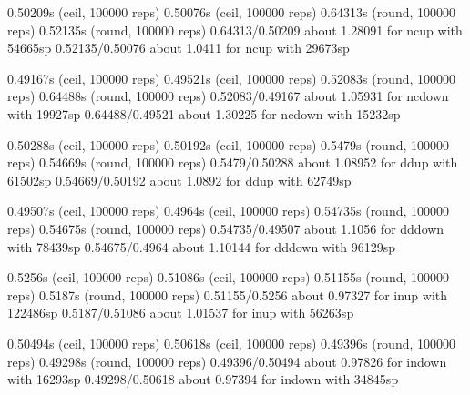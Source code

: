 0.50209s (ceil, 100000 reps)                            0.50076s (ceil, 100000 reps)                           
0.64313s (round, 100000 reps)                           0.52135s (round, 100000 reps)                          
0.64313/0.50209 about 1.28091 for ncup with 54665sp     0.52135/0.50076 about 1.0411 for ncup with 29673sp     
                                                                                                               
0.49167s (ceil, 100000 reps)                            0.49521s (ceil, 100000 reps)                           
0.52083s (round, 100000 reps)                           0.64488s (round, 100000 reps)                          
0.52083/0.49167 about 1.05931 for ncdown with 19927sp   0.64488/0.49521 about 1.30225 for ncdown with 15232sp  
                                                                                                               
0.50288s (ceil, 100000 reps)                            0.50192s (ceil, 100000 reps)                           
0.5479s (round, 100000 reps)                            0.54669s (round, 100000 reps)                          
0.5479/0.50288 about 1.08952 for ddup with 61502sp      0.54669/0.50192 about 1.0892 for ddup with 62749sp     
                                                                                                               
0.49507s (ceil, 100000 reps)                            0.4964s (ceil, 100000 reps)                            
0.54735s (round, 100000 reps)                           0.54675s (round, 100000 reps)                          
0.54735/0.49507 about 1.1056 for dddown with 78439sp    0.54675/0.4964 about 1.10144 for dddown with 96129sp   
                                                                                                               
0.5256s (ceil, 100000 reps)                             0.51086s (ceil, 100000 reps)                           
0.51155s (round, 100000 reps)                           0.5187s (round, 100000 reps)                           
0.51155/0.5256 about 0.97327 for inup with 122486sp     0.5187/0.51086 about 1.01537 for inup with 56263sp     
                                                                                                               
0.50494s (ceil, 100000 reps)                            0.50618s (ceil, 100000 reps)                           
0.49396s (round, 100000 reps)                           0.49298s (round, 100000 reps)                          
0.49396/0.50494 about 0.97826 for indown with 16293sp   0.49298/0.50618 about 0.97394 for indown with 34845sp  
                                                                                                               
